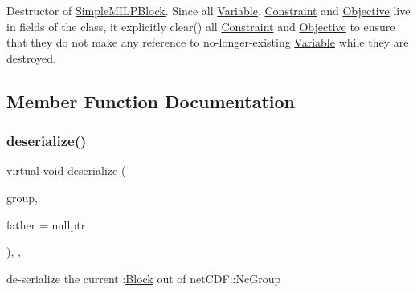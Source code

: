 Destructor of \mbox{\hyperlink{class_s_m_spp__di__unipi__it_1_1_simple_m_i_l_p_block}{Simple\+M\+I\+L\+P\+Block}}. Since all \mbox{\hyperlink{class_s_m_spp__di__unipi__it_1_1_variable}{Variable}}, \mbox{\hyperlink{class_s_m_spp__di__unipi__it_1_1_constraint}{Constraint}} and \mbox{\hyperlink{class_s_m_spp__di__unipi__it_1_1_objective}{Objective}} live in fields of the class, it explicitly clear() all \mbox{\hyperlink{class_s_m_spp__di__unipi__it_1_1_constraint}{Constraint}} and \mbox{\hyperlink{class_s_m_spp__di__unipi__it_1_1_objective}{Objective}} to ensure that they do not make any reference to no-\/longer-\/existing \mbox{\hyperlink{class_s_m_spp__di__unipi__it_1_1_variable}{Variable}} while they are destroyed. 

\subsection{Member Function Documentation}
\mbox{\label{class_s_m_spp__di__unipi__it_1_1_simple_m_i_l_p_block_a817e3ce47ea40c14517ec16c6b62b814}} 
\subsubsection{\texorpdfstring{deserialize()}{deserialize()}}
{\footnotesize\ttfamily virtual void deserialize (\begin{DoxyParamCaption}\item[{net\+C\+D\+F\+::\+Nc\+Group \&\&}]{group,  }\item[{\mbox{\hyperlink{class_s_m_spp__di__unipi__it_1_1_block}{Block}} $\ast$}]{father = {\ttfamily nullptr} }\end{DoxyParamCaption})\hspace{0.3cm}{\ttfamily [override]}, {\ttfamily [protected]}, {\ttfamily [virtual]}}



de-\/serialize the current \+:\mbox{\hyperlink{class_s_m_spp__di__unipi__it_1_1_block}{Block}} out of net\+C\+D\+F\+::\+Nc\+Group 

